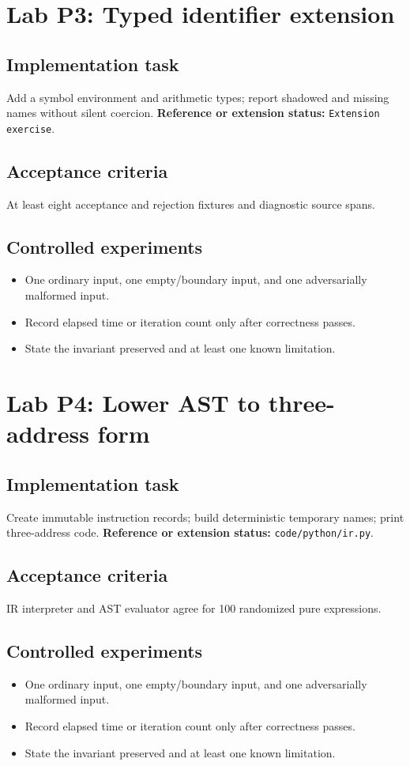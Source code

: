 \documentclass[10pt,letterpaper]{article}
\begin{document}
\section{Lab P3: Typed identifier extension}
\subsection{Implementation task}
Add a symbol environment and arithmetic types; report shadowed and missing names without silent coercion.
\textbf{Reference or extension status:} \texttt{Extension exercise}.\par\subsection{Acceptance criteria}
At least eight acceptance and rejection fixtures and diagnostic source spans.
\subsection{Controlled experiments}
\begin{itemize}
\item One ordinary input, one empty/boundary input, and one adversarially malformed input.
\item Record elapsed time or iteration count only after correctness passes.
\item State the invariant preserved and at least one known limitation.
\end{itemize}


\section{Lab P4: Lower AST to three-address form}
\subsection{Implementation task}
Create immutable instruction records; build deterministic temporary names; print three-address code.
\textbf{Reference or extension status:} \texttt{code/python/ir.py}.\par\subsection{Acceptance criteria}
IR interpreter and AST evaluator agree for 100 randomized pure expressions.
\subsection{Controlled experiments}
\begin{itemize}
\item One ordinary input, one empty/boundary input, and one adversarially malformed input.
\item Record elapsed time or iteration count only after correctness passes.
\item State the invariant preserved and at least one known limitation.
\end{itemize}
\end{document}
